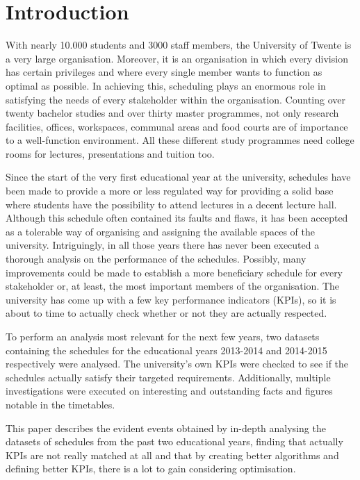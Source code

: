 \section{Introduction}
With nearly 10.000 students and 3000 staff members, the University of Twente is a very large organisation\cite{stats_uTwente}. Moreover, it is an organisation in which every division has certain privileges and where every single member wants to function as optimal as possible. In achieving this, scheduling plays an enormous role in satisfying the needs of every stakeholder within the organisation. Counting over twenty bachelor studies and over thirty master programmes, not only research facilities, offices, workspaces, communal areas and food courts are of importance to a well-function environment. All these different study programmes need college rooms for lectures, presentations and tuition too.

Since the start of the very first educational year at the university, schedules have been made to provide a more or less regulated way for providing a solid base where students have the possibility to attend lectures in a decent lecture hall. Although this schedule often contained its faults and flaws, it has been accepted as a tolerable way of organising and assigning the available spaces of the university. Intriguingly, in all those years there has never been executed a thorough analysis on the performance of the schedules. Possibly, many improvements could be made to establish a more beneficiary schedule for every stakeholder or, at least, the most important members of the organisation. The university has come up with a few key performance indicators (KPIs), so it is about to time to actually check whether or not they are actually respected.

To perform an analysis most relevant for the next few years, two datasets containing the schedules for the educational years 2013-2014 and 2014-2015 respectively were analysed. The university’s own KPIs were checked to see if the schedules actually satisfy their targeted requirements. Additionally, multiple investigations were executed on interesting and outstanding facts and figures notable in the timetables.

This paper describes the evident events obtained by in-depth analysing the datasets of schedules from the past two educational years, finding that actually KPIs are not really matched at all and that by creating better algorithms and defining better KPIs, there is a lot to gain considering optimisation.